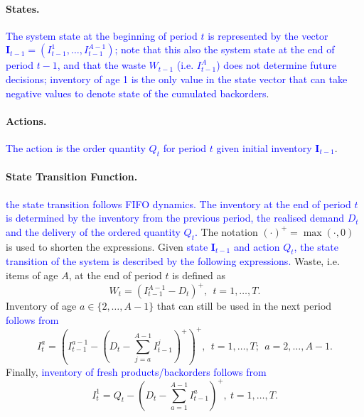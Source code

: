 \documentclass{tPRS2e}
\newcommand{\blue}{\textcolor{blue}}
\begin{document}
	\paragraph*{\bf States.}
\blue{The system state at the beginning of period $t$ is represented by the vector $\mathbf{I}_{t-1}=(I^1_{t-1},\ldots,I^{A-1}_{t-1})$; note that this also the system state at the end of period $t-1$, and that the waste $W_{t-1}$ (i.e. $I^A_{t-1}$) does not determine future decisions; inventory of age 1 is the only value in the state vector that can take negative values to denote state of the cumulated backorders}. 
	
	
	\paragraph*{\bf Actions.}
\blue{The action is the order quantity $Q_t$ for period $t$ given initial inventory $\mathbf{I}_{t-1}$}.
	
	\paragraph*{\bf State Transition Function.}
\blue{the state transition follows FIFO dynamics. The inventory at the end of period $t$ is determined by the inventory from the previous period, the realised demand $D_t$ and the delivery of the ordered quantity $Q_t$.} The notation $(\cdot)^+ = \max(\cdot,0)$ is used to shorten the expressions. Given \blue{state $\mathbf{I}_{t-1}$ and action $Q_t$, the state transition of the system is described by the following expressions.} Waste, i.e. items of age $A$, at the end of period $t$ is defined as
%	
	\begin{equation}
		\label{eq:invWaste}
		W_t=(I^{A-1}_{t-1} - D_t)^+, ~~t=1,\ldots,T.
	\end{equation}
	Inventory of age $a\in\{2,\ldots,A-1\}$ that can still be  used in the next period \blue{follows from}
	\begin{equation}
		\label{eq:inv2}
		I^a_{t}= \left(I^{a-1}_{t-1} - (D_t-\sum_{j=a}^{A-1} I^j_{t-1})^+\right)^+, ~~t=1,\ldots,T; ~~ a=2,\ldots,A-1.
	\end{equation}
	Finally,  \blue{inventory of fresh products/backorders follows from}
	\begin{equation}
		\label{eq:inv1}
		I^1_{t}= Q_t - (D_t-\sum_{a=1}^{A-1}I^a_{t-1})^+, \ t=1,\ldots,T.
	\end{equation}
	
\end{document}
